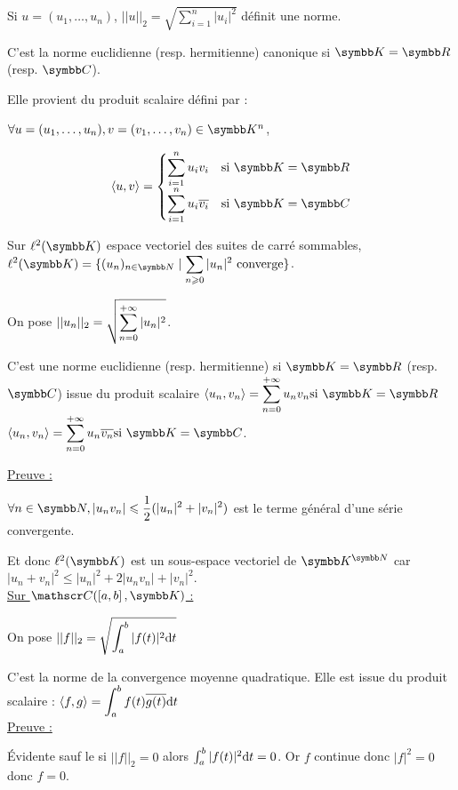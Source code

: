 \begin{exemple}
    Si $u = (u_1, \dots, u_n)$, $\displaystyle ||u||_2 = \sqrt{\sum_{i = 1}^{n} |u_i|^2}$
    définit une norme. 

    C'est la norme euclidienne (resp. hermitienne) canonique si $\K = \R$ (resp. $\C$). 

    Elle provient du produit scalaire défini par : 

    $\forall u = (u_1, \dots, u_n), v = (v_1, \dots, v_n) \in \K^n$,

    \[
    \langle u, v \rangle = \begin{cases}
        \ds \sum_{i = 1}^{n} u_i v_i & \text{si } \K = \R \\
        \ds \sum_{i = 1}^{n} u_i \overline{v_i} & \text{si } \K = \C \\
    \end{cases}
    \]

    Sur $\ell^2(\K)$ espace vectoriel des suites de carré sommables,
    $\ds \ell^2(\K) = \{(u_n)_{n \in \N} \mid \sum_{n \geqslant 0} |u_n|^2 \text{ converge}\}$.
    
    On pose $\displaystyle ||u_n||_2 = \sqrt{\sum_{n = 0 }^{+ \infty} |u_n|^2}$.

    C'est une norme euclidienne (resp. hermitienne) si $\K = \R$ (resp. $\C$) issue
    du produit scalaire $\ds \langle u_n, v_n \rangle = \sum_{n = 0}^{+ \infty} u_n v_n \text{si } \K = \R$
    $\ds \langle u_n, v_n \rangle = \sum_{n = 0}^{+ \infty} u_n \overline{v_n} \text{si } \K = \C$.

    \uline{Preuve :}

    \svspace $\ds \forall n \in \N, |u_n v_n| \leqslant \frac 1 2 (|u_n|^2 + |v_n|^2)$ est le terme
    général d'une série convergente. 

    Et donc $\ell^2(\K)$ est un sous-espace vectoriel de $\K^{\N}$ car $|u_n + v_n|^2 \leqslant |u_n|^2 + 2 |u_n v_n| + |v_n|^2$. \\

    \uline{Sur $\mathscr C(\inter{a}{b}, \K)$ :}

    \avspace On pose $\displaystyle ||f||_2 = \sqrt{\int_{a}^{b} |f(t)|^2 \text d t}$

    C'est la norme de la convergence moyenne quadratique. Elle est issue du produit scalaire :
    $\displaystyle \langle f, g \rangle = \int_{a}^{b} f(t) \overline{g(t)} \text d t$ \\

    \uline{Preuve :}

    Évidente sauf le si $||f||_2 = 0$ alors $\int_{a }^{b } |f(t)|^2 \text d t = 0$. Or $f$ continue donc $|f|^2 = 0 $ donc $f = 0$.
\end{exemple}


